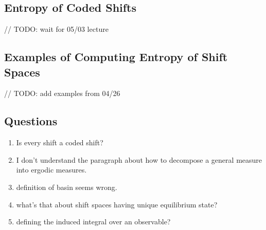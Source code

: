 \documentclass[11pt, reqno]{amsart}
\theoremstyle{plain}
\numberwithin{thm}{subsection}
\theoremstyle{definition}
\begin{document}
\subsection{Entropy of Coded Shifts}\cite[L12]{wolf}
// TODO: wait for 05/03 lecture

\subsection{Examples of Computing Entropy of Shift Spaces}
// TODO: add examples from 04/26

\subsection{Questions}
\begin{enumerate}
  \item Is every shift a coded shift?
  \item I don't understand the paragraph about how to decompose a general measure into ergodic measures.
  \item definition of basin seems wrong.
  \item what's that about shift spaces having unique equilibrium state?
  \item defining the induced integral over an observable?
\end{enumerate}




\newpage
\appendix
\end{document}
